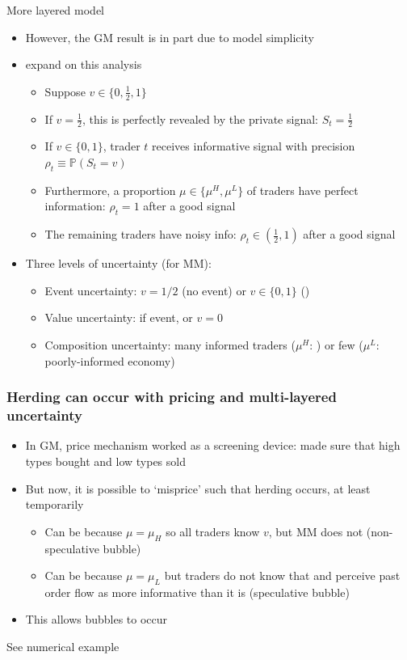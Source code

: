 \documentclass[english,10pt
,aspectratio=169
]{beamer}
\begin{document}
\begin{frame}{More layered model}
	\begin{itemize}
		\item However, the GM result is in part due to model simplicity
		\item \cite{avery_multidimensional_1998} expand on this analysis
		\begin{itemize}
			\item Suppose $v \in \{0,\frac{1}{2},1\}$
			\item If $v=\frac{1}{2}$, this is perfectly revealed by the private signal: $S_{t}=\frac{1}{2}$
			\item If $v \in \{0,1\}$, trader $t$ receives informative signal with precision $\rho_t \equiv \mathbb{P}(S_{t}=v)$
			\item Furthermore, a proportion $\mu \in \{\mu^{H}, \mu^{L}\}$ of traders have perfect information: $\rho_{t}=1$ after a good signal
			\item The remaining traders have noisy info: $\rho_{t} \in (\frac{1}{2},1)$ after a good signal
		\end{itemize}
		\pause
		\item Three levels of uncertainty (for MM): 
		\begin{itemize}
			\item Event uncertainty: $v=1/2$ (\alert{no event}) or $v \in \{0,1\}$ ()
			\item Value uncertainty: if event,  or \alert{$v=0$}
			\item Composition uncertainty: many informed traders ($\mu^{H}$: ) or few ($\mu^{L}$: \alert{poorly-informed economy})
		\end{itemize}
	\end{itemize}
\end{frame}


\begin{frame}[label=az]
	\frametitle{Herding can occur with pricing and multi-layered uncertainty}
	\begin{itemize}
		\item In GM, price mechanism worked as a screening device: made sure that high types bought and low types sold
		\item But now, it is possible to `misprice' such that herding occurs, at least temporarily
		\begin{itemize}
			\item Can be because $\mu = \mu_H$ so all traders know $v$, but MM does not (non-speculative bubble)
			\item Can be because $\mu = \mu_L$ but traders do not know that and perceive past order flow as more informative than it is (speculative bubble)
		\end{itemize}
		\item This allows bubbles to occur
	\end{itemize}
	See numerical example \hyperlink{layers}{}
\end{frame}
\end{document}
